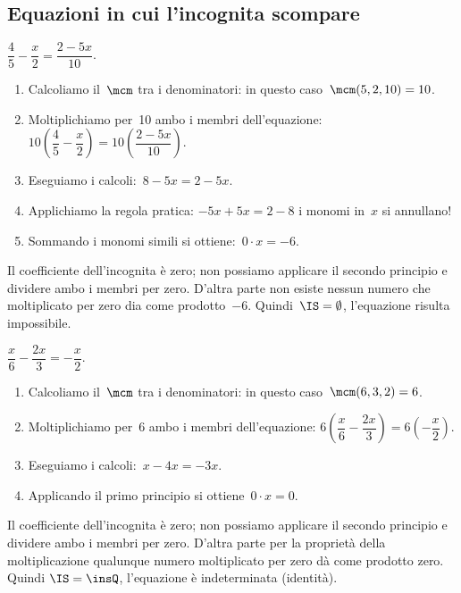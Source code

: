 

\subsection{Equazioni in cui l'incognita scompare}

 \begin{esempio}
 \(\dfrac{4}{5}-\dfrac{x}{2}=\dfrac{2-5x}{10}\).

 \begin{enumerate}
  \item Calcoliamo il~\(\mcm\) tra i denominatori: in questo
caso~\(\mcm(5, 2, 10) = 10\).
  \item Moltiplichiamo per~10 ambo i membri
dell'equazione:
\(10\left(\dfrac{4}{5}-\dfrac{x}{2}\right)=10\left(\dfrac{2-5x}{10}\right)\).
  \item Eseguiamo i calcoli:~\(8-5x=2-5x\).
  \item Applichiamo la regola pratica:
\(-5x+5x=2-8\) i monomi in~\(x\) si annullano!
  \item Sommando i monomi simili si ottiene:~\(0\cdot x=-6\).
 \end{enumerate}

Il coefficiente dell'incognita è zero; non possiamo
applicare il secondo principio e dividere ambo i membri per zero.
D'altra parte non esiste nessun numero che moltiplicato
per zero dia come prodotto~\(-6\). Quindi~\(\IS =\emptyset \),
l'equazione risulta impossibile.
 \end{esempio}

 \begin{esempio}
\(\dfrac{x}{6}-\dfrac{2x}{3}=-{\dfrac{x}{2}}\).

\begin{enumerate}
 \item Calcoliamo il~\(\mcm\) tra i denominatori: in questo
caso~\(\mcm(6, 3, 2) = 6\).
 \item Moltiplichiamo per~6 ambo i membri
dell'equazione:
\(6\left(\dfrac{x}{6}-\dfrac{2x}{3}\right)=6\left(-{\dfrac{x}{2}}\right)\).
 \item Eseguiamo i calcoli:~\(x-4x=-3x\).
 \item Applicando il primo principio si ottiene~\(0\cdot x=0\).
\end{enumerate}

Il coefficiente dell'incognita è zero; non possiamo
applicare il secondo principio e dividere ambo i membri per zero.
D'altra parte per la proprietà della moltiplicazione
qualunque numero moltiplicato per zero dà come prodotto zero. Quindi
\(\IS = \insQ\), l'equazione è indeterminata (identità).
 \end{esempio}

